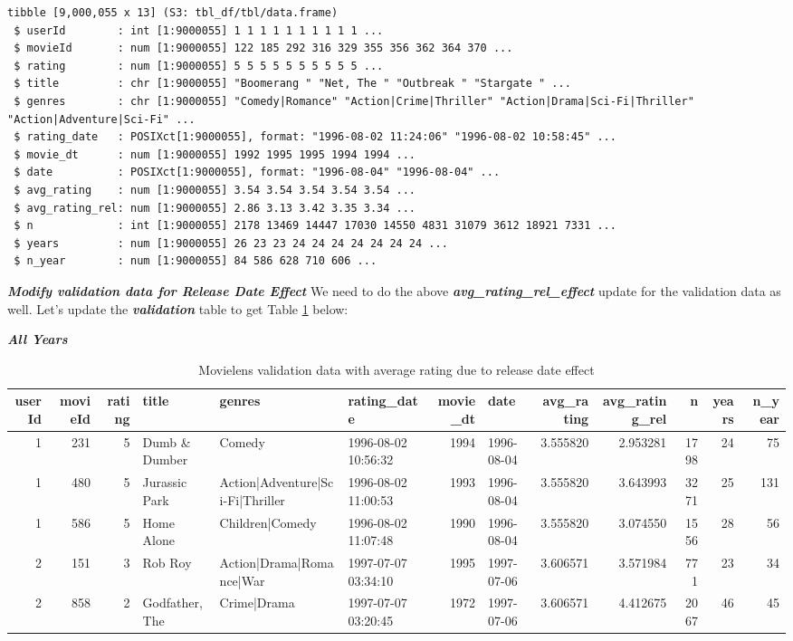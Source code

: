 \documentclass[
]{article}
\begin{document}
\begin{verbatim}
tibble [9,000,055 x 13] (S3: tbl_df/tbl/data.frame)
 $ userId        : int [1:9000055] 1 1 1 1 1 1 1 1 1 1 ...
 $ movieId       : num [1:9000055] 122 185 292 316 329 355 356 362 364 370 ...
 $ rating        : num [1:9000055] 5 5 5 5 5 5 5 5 5 5 ...
 $ title         : chr [1:9000055] "Boomerang " "Net, The " "Outbreak " "Stargate " ...
 $ genres        : chr [1:9000055] "Comedy|Romance" "Action|Crime|Thriller" "Action|Drama|Sci-Fi|Thriller" "Action|Adventure|Sci-Fi" ...
 $ rating_date   : POSIXct[1:9000055], format: "1996-08-02 11:24:06" "1996-08-02 10:58:45" ...
 $ movie_dt      : num [1:9000055] 1992 1995 1995 1994 1994 ...
 $ date          : POSIXct[1:9000055], format: "1996-08-04" "1996-08-04" ...
 $ avg_rating    : num [1:9000055] 3.54 3.54 3.54 3.54 3.54 ...
 $ avg_rating_rel: num [1:9000055] 2.86 3.13 3.42 3.35 3.34 ...
 $ n             : int [1:9000055] 2178 13469 14447 17030 14550 4831 31079 3612 18921 7331 ...
 $ years         : num [1:9000055] 26 23 23 24 24 24 24 24 24 24 ...
 $ n_year        : num [1:9000055] 84 586 628 710 606 ...
\end{verbatim}

\newpage

\textbf{\emph{Modify validation data for Release Date Effect}} We need
to do the above \textbf{\emph{avg\_rating\_rel\_effect}} update for the
validation data as well. Let's update the \textbf{\emph{validation}}
table to get Table
\ref{tbl:movielens_validation_avg_release_date_effect} below:

\textbf{\emph{All Years}}

\begin{table}[H]

\caption{\label{tab:md_8}Movielens validation data with average rating due to release date effect\label{tbl:movielens_validation_avg_release_date_effect}}
\centering
\fontsize{4}{6}\selectfont
\begin{tabular}[t]{rrrlllrlrrrrr}
\toprule
userId & movieId & rating & title & genres & rating\_date & movie\_dt & date & avg\_rating & avg\_rating\_rel & n & years & n\_year\\
\midrule
1 & 231 & 5 & Dumb \& Dumber & Comedy & 1996-08-02 10:56:32 & 1994 & 1996-08-04 & 3.555820 & 2.953281 & 1798 & 24 & 75\\
1 & 480 & 5 & Jurassic Park & Action|Adventure|Sci-Fi|Thriller & 1996-08-02 11:00:53 & 1993 & 1996-08-04 & 3.555820 & 3.643993 & 3271 & 25 & 131\\
1 & 586 & 5 & Home Alone & Children|Comedy & 1996-08-02 11:07:48 & 1990 & 1996-08-04 & 3.555820 & 3.074550 & 1556 & 28 & 56\\
2 & 151 & 3 & Rob Roy & Action|Drama|Romance|War & 1997-07-07 03:34:10 & 1995 & 1997-07-06 & 3.606571 & 3.571984 & 771 & 23 & 34\\
2 & 858 & 2 & Godfather, The & Crime|Drama & 1997-07-07 03:20:45 & 1972 & 1997-07-06 & 3.606571 & 4.412675 & 2067 & 46 & 45\\
\bottomrule
\end{tabular}
\end{table}
\end{document}
